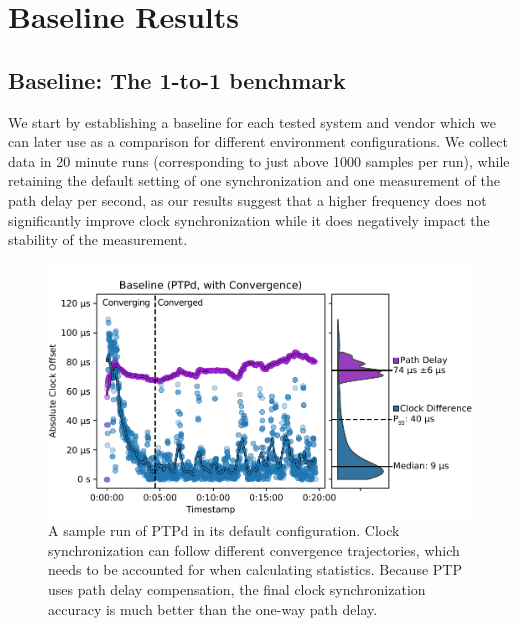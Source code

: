 
\section{Baseline Results}

\subsection{Baseline: The 1-to-1 benchmark}

We start by establishing a baseline for each tested system and vendor which we can later use as a comparison for different environment configurations. We collect data in 20 minute runs (corresponding to just above 1000 samples per run), while retaining the default setting of one synchronization and one measurement of the path delay per second, as our results suggest that a higher frequency does not significantly improve clock synchronization while it does negatively impact the stability of the measurement.

\begin{figure}
    \includegraphics[width=\linewidth]{res/generated/base/rpi08-convergence_2.pdf}
    \caption{A sample run of PTPd in its default configuration. Clock synchronization can follow different convergence trajectories, which needs to be accounted for when calculating statistics. Because PTP uses path delay compensation, the final clock synchronization accuracy is much better than the one-way path delay.}
    \label{fig:baseline_sample}
\end{figure}

